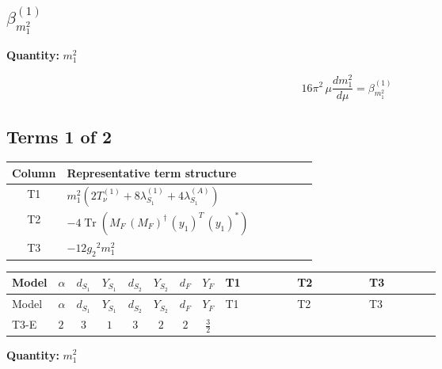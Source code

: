 \documentclass[8pt]{article}
\begin{document}
\begin{landscape}
\section*{$\beta_{m_1^2}^{(1)}$}
\noindent\textbf{Quantity: }$m_1^2$\par\smallskip
\[16\pi^2\,\mu\frac{d m_1^2}{d\mu}=\beta_{m_1^2}^{(1)}\]
\subsection*{Terms 1 of 2}
\begin{center}
\begin{tabular}{@{}c >{\raggedright\arraybackslash}p{0.82\linewidth}@{}}
\toprule
Column & Representative term structure \\
\midrule
T1 & \(\displaystyle {m_1^2} (2 T_{\nu}^{(1)}+8 {\lambda_{S_1}^{(1)}}+4 {\lambda_{S_1}^{(A)}})\) \\
\midrule
T2 & \(\displaystyle -4 \operatorname{Tr}\!\left({M_F}\,\left({M_F}\right)^{\dagger}\,\left({y_1}\right)^{T}\,\left({y_1}\right)^{*}\right)\) \\
\midrule
T3 & \(\displaystyle -12 {g_2}^2 {m_1^2}\) \\
\midrule
\bottomrule
\end{tabular}
\end{center}
\smallskip
\tiny
\begin{longtable}{@{}llcccccc >{\raggedright\arraybackslash}p{0.21\linewidth} >{\raggedright\arraybackslash}p{0.21\linewidth} >{\raggedright\arraybackslash}p{0.21\linewidth}@{}}
\toprule
Model & $\alpha$ & $d_{S_1}$ & $Y_{S_1}$ & $d_{S_2}$ & $Y_{S_2}$ & $d_F$ & $Y_F$ & T1 & T2 & T3 \\
\midrule
\endfirsthead
\toprule
Model & $\alpha$ & $d_{S_1}$ & $Y_{S_1}$ & $d_{S_2}$ & $Y_{S_2}$ & $d_F$ & $Y_F$ & T1 & T2 & T3 \\
\midrule
\endhead
T3-E & $2$ & $3$ & $1$ & $3$ & $2$ & $2$ & $\frac{3}{2}$ & \scriptsize\adjustbox{max width=\linewidth}{$\begin{gathered} {m_1^2} (2 T_{\nu}^{(1)}+8 {\lambda_{S_1}^{(1)}}+4 {\lambda_{S_1}^{(A)}})\end{gathered}$} & \scriptsize\adjustbox{max width=\linewidth}{$\begin{gathered} -4 \operatorname{Tr}\!\left({M_F}\,\left({M_F}\right)^{\dagger}\,\left({y_1}\right)^{T}\,\left({y_1}\right)^{*}\right)\end{gathered}$} & \scriptsize\adjustbox{max width=\linewidth}{$\begin{gathered} -12 {g_2}^2 {m_1^2}\end{gathered}$} \\
\midrule
\bottomrule
\end{longtable}
\clearpage
\noindent\textbf{Quantity: }$m_1^2$\par\smallskip

\end{landscape}
\end{document}
